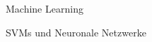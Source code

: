 \documentclass{newlayout}
\begin{document}
 \setcounter{page}{3}

\setcounter{tocdepth}{1}
 \tableofcontents

   \setcounter{secnumdepth}{1}


\setcounter{page}{7}
\setcounter{chapter}{0}




\begin{coursetitle}
  \centerline{Machine Learning} 
  \bigskip
  \Large \centerline{SVMs und Neuronale Netzwerke}
  \bigskip
 \label{fig:meinbild}
  \bigskip
\end{coursetitle}






%
%


\end{document}
